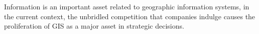 

Information is an important asset related to geographic information systems, in the current context, the unbridled competition that companies indulge causes the proliferation of GIS as a major asset in strategic decisions.










